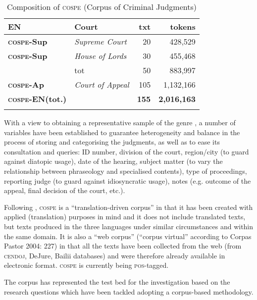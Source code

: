 \documentclass[output=paper]{LSP/langsci}
\begin{document}
\begin{table}
\begin{tabular}{llrr}
       \textbf{EN}  & \textbf{Court}       & \textbf{txt}  & \textbf{tokens} \\ \midrule
       \textbf{\textsc{cospe}-\textsc{S}up}    & \textit{Supreme Court}             & 20				& 428,529\\
       \textbf{\textsc{cospe}-\textsc{S}up}       & \textit{House of Lords}         & 30				& 455,468\\
                                & tot     & 50				& 883,997\\
       \textbf{\textsc{cospe}-\textsc{A}p}  & \textit{Court of Appeal} & 105				& 1,132,166\\ \midrule
       \textbf{\textsc{cospe}-EN(tot.)}   &    &     \textbf{155}				& \textbf{2,016,163}\\  
\lspbottomrule
\end{tabular}
 
\caption{Composition of \textsc{cospe} (Corpus of Criminal Judgments)}
     \label{tab:6.3}
\end{table} 

With a view to obtaining a representative sample of the genre \citep[see][243]{Biber1993}, a number of variables have been established to guarantee heterogeneity and balance in the process of storing and categorising the judgments, as well as to ease its consultation and queries: ID number, division of the court, region/city (to guard against diatopic usage), date of the hearing, subject matter (to vary the relationship between phraseology and specialised contents), type of proceedings, reporting judge (to guard against idiosyncratic usage), notes (e.g. outcome of the appeal, final decision of the court, etc.).

Following \citet[105--107]{Zanettin2012}, \textsc{cospe} is a “translation-driven corpus” in that it has been created with applied (translation) purposes in mind and it does not include translated texts, but texts produced in the three languages under similar circumstances and within the same domain. It is also a “web corpus” (“corpus virtual” according to Corpas Pastor 2004: 227) in that all the texts have been collected from the web (from \textsc{cendoj}, DeJure, Bailii databases) and were therefore already available in electronic format. \textsc{cospe} is currently being \textsc{pos}-tagged.

The corpus has represented the test bed for the investigation based on the research questions which have been tackled adopting a corpus-based methodology.
\end{document}
